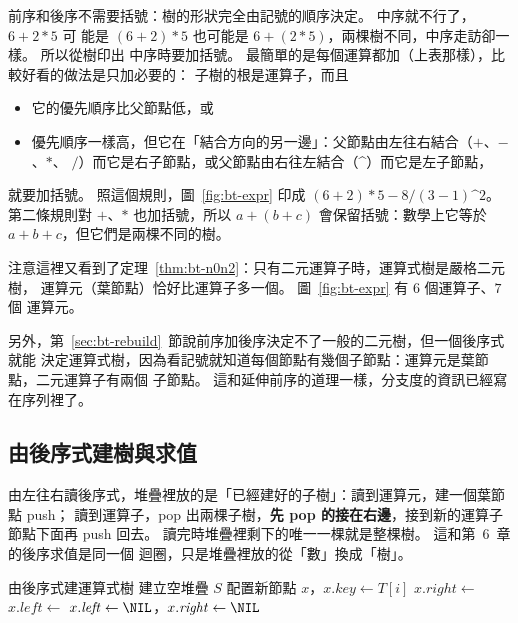 前序和後序不需要括號：樹的形狀完全由記號的順序決定。 中序就不行了，$6 + 2 * 5$ 可
能是 $(6 + 2) * 5$ 也可能是 $6 + (2 * 5)$，兩棵樹不同，中序走訪卻一樣。 所以從樹印出
中序時要加括號。 最簡單的是每個運算都加（上表那樣），比較好看的做法是只加必要的：
子樹的根是運算子，而且
\begin{itemize}
\item 它的優先順序比父節點低，或
\item 優先順序一樣高，但它在「結合方向的另一邊」：父節點由左往右結合（$+$、$-$、$*$、
$/$）而它是右子節點，或父節點由右往左結合（\textasciicircum）而它是左子節點，
\end{itemize}
就要加括號。 照這個規則，圖~\ref{fig:bt-expr} 印成
$(6 + 2) * 5 - 8 / (3 - 1) \text{\textasciicircum} 2$。 第二條規則對 $+$、$*$ 也加括號，所以
$a + (b + c)$ 會保留括號：數學上它等於 $a + b + c$，但它們是兩棵不同的樹。

注意這裡又看到了定理~\ref{thm:bt-n0n2}：只有二元運算子時，運算式樹是嚴格二元樹，
運算元（葉節點）恰好比運算子多一個。 圖~\ref{fig:bt-expr} 有 $6$ 個運算子、$7$ 個
運算元。

另外，第~\ref{sec:bt-rebuild}~節說前序加後序決定不了一般的二元樹，但一個後序式就能
決定運算式樹，因為看記號就知道每個節點有幾個子節點：運算元是葉節點，二元運算子有兩個
子節點。 這和延伸前序的道理一樣，分支度的資訊已經寫在序列裡了。

\subsection{由後序式建樹與求值}

由左往右讀後序式，堆疊裡放的是「已經建好的子樹」：讀到運算元，建一個葉節點 push；
讀到運算子，pop 出兩棵子樹，\textbf{先 pop 的接在右邊}，接到新的運算子節點下面再
push 回去。 讀完時堆疊裡剩下的唯一一棵就是整棵樹。 這和第~6~章的後序求值是同一個
迴圈，只是堆疊裡放的從「數」換成「樹」。

\begin{pseudo}[label=alg:bt-postfix-tree]{由後序式建運算式樹}
 
    \State 建立空堆疊 $S$
        \State 配置新節點 $x$，$x.\mathit{key} \gets T[i]$
            \State $x.\mathit{right} \gets$ 
            \State $x.\mathit{left} \gets$ 
        \Else
            \State $x.\mathit{left} \gets \NIL$，$x.\mathit{right} \gets \NIL$
        \EndIf
        \State {}
    \EndFor
    \State \Return {}
\EndFunction
\end{pseudo}

